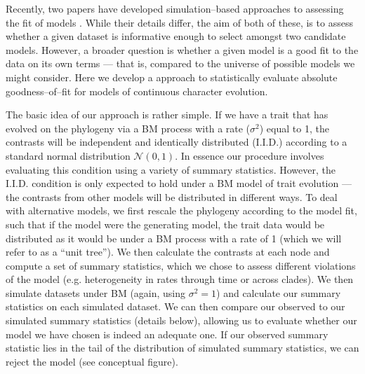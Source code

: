 \documentclass[a4paper,12pt]{article}
\begin{document}
Recently, two papers have developed simulation--based approaches to assessing the fit of models \citep{Boettiger2012, SlaterPennell}. While their details differ, the aim of both of these, is to assess whether a given dataset is informative enough to select amongst two candidate models. However, a broader question is whether a given model is a good fit to the data on its own terms --- that is, compared to the universe of possible models we might consider. Here we develop a approach to statistically evaluate absolute goodness--of--fit for models of continuous character evolution.

The basic idea of our approach is rather simple. If we have a trait that has evolved on the phylogeny via a BM process with a rate ($\sigma^2$) equal to 1, the contrasts \citep[\textit{sensu}][see below]{Felsenstein1985} will be independent and identically distributed (I.I.D.) according to a standard normal distribution $\mathcal{N}(0,1)$. In essence our procedure involves evaluating this condition using a variety of summary statistics. However, the I.I.D. condition is only expected to hold under a BM model of trait evolution --- the contrasts from other models will be distributed in different ways. To deal with alternative models, we first rescale the phylogeny according to the model fit, such that if the model were the generating model, the trait data would be distributed as it would be under a BM process with a rate of 1 (which we will refer to as a ``unit tree''). We then calculate the contrasts at each node and compute a set of summary statistics, which we chose to assess different violations of the model (e.g. heterogeneity in rates through time or across clades). We then simulate datasets under BM (again, using $\sigma^2 = 1$) and calculate our summary statistics on each simulated dataset. We can then compare our observed to our simulated summary statistics (details below), allowing us to evaluate whether our model we have chosen is indeed an adequate one. If our observed summary statistic lies in the tail of the distribution of simulated summary statistics, we can reject the model (see conceptual figure).

\end{document}
